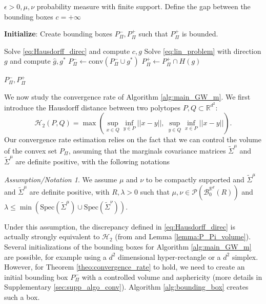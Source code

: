 \documentclass{article}
\newcommand{\R}{\mathbb{R}}
\newcommand{\1}{\mathbf{1}}
\renewcommand{\P}{\mathcal{P}}
\theoremstyle{definition}
\theoremstyle{remark}
\newtheorem{assumption}{Assumption/Notation}
\begin{document}
\begin{algorithm}
\caption{Approximation of $P_\Pi$ \cite{kamenev1996algorithm}}\label{alg:main_GW_m} 
\begin{algorithmic}[1]
\Require  $\epsilon>0,\mu,\nu$ probability measure with finite support.
\State Define the gap between the bounding boxes $c=+\infty$
 
\State \textbf{Initialize}: Create bounding boxes $P_\Pi^-,P_\Pi^+$ such that $P_\Pi^+$ is bounded.


    \State Solve \eqref{eq:Hausdorff_direc} and compute $c,g$
    \State Solve \eqref{eq:lin_problem} with direction $g$ and compute $\hat{g},g^*$
    \State $P_\Pi^-\gets \mathrm{conv} (P_\Pi^-\cup g^*)$  
    \State $P_\Pi^+\gets P_\Pi^+\cap H(g)$ 
\EndWhile

\State \Return $P_\Pi^-,P_\Pi^+$

\end{algorithmic}
\end{algorithm}
We now study the convergence rate of Algorithm \ref{alg:main_GW_m}. We first introduce the Hausdorff distance between two polytopes $P,Q\subset\R^{d^2}$: 
\begin{equation}
    \label{eq:hauss_distance}
    \mathcal{H}_2(P,Q)= \max\left(\sup_{x\in Q}\inf_{y\in P} ||x-y||,\ \sup_{y\in Q}\inf_{x\in P} ||x-y||\right).
\end{equation}
Our convergence rate estimation relies on the fact that we can control the volume of the convex set $P_\Pi$, assuming that the marginals covariance matrices $\tilde{\Sigma}^\mu$ and $\tilde{\Sigma}^\mu$ are definite positive, with the following notations
\begin{assumption}\label{assump_full_dim}
    We assume $\mu$ and $\nu$ to be compactly supported and $\tilde{\Sigma}^\mu$ and $\tilde{\Sigma}^\mu$ are definite positive, with $R, \lambda >0$ such that $\mu,\nu\in\P(\mathcal{B}^{\R^d}_0(R))$ and $\lambda\leq\min(\mathrm{Spec}(\tilde{\Sigma}^\mu)\cup \mathrm{Spec}(\tilde{\Sigma}^\nu))$. 
\end{assumption}
Under this assumption, the discrepancy defined in \eqref{eq:Hausdorff_direc} is actually strongly equivalent to $\mathcal{H}_2$ (from  \cite[Lemma 4.4]{lammel2023convergence} and Lemma \ref{lemma:P_Pi_volume}). Several initializations of the bounding boxes for Algorithm \ref{alg:main_GW_m} are possible, for example using a $d^2$ dimensional hyper-rectangle  or a $d^2$ simplex. However, for  Theorem \ref{theo:convergence_rate} to hold, we need to create an initial bounding box $P_\Pi^-$ with a controlled volume and asphericity (more details in Supplementary \ref{sec:supp_algo_conv}). Algorithm \ref{alg:bounding_box} creates such a box.
\end{document}
